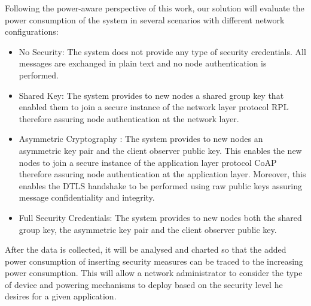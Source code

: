 Following the power-aware perspective of this work, our solution will evaluate the power consumption of the system in several scenarios with different network configurations:

\begin{itemize}
	\item No Security: The system does not provide any type of security credentials. All messages are exchanged in plain text and no node authentication is performed.
	\item Shared Key: The system provides to new nodes a shared group key that enabled them to join a secure instance of the network layer protocol RPL therefore assuring node authentication at the network layer.
	\item Asymmetric Cryptography : The system provides to new nodes an asymmetric key pair and the client observer public key. This enables the new nodes to join a secure instance of the application layer protocol \ac{CoAP} therefore assuring node authentication at the application layer. Moreover, this enables the \ac{DTLS} handshake to be performed using raw public keys assuring message confidentiality and integrity.
	\item Full Security Credentials: The system provides to new nodes both the shared group key, the asymmetric key pair and the client observer public key. 
\end{itemize}

After the data is collected, it will be analysed and charted so that the added power consumption of inserting security measures can be traced to the increasing power consumption. This will allow a network administrator to consider the type of device and powering mechanisms to deploy based on the security level he desires for a given application.